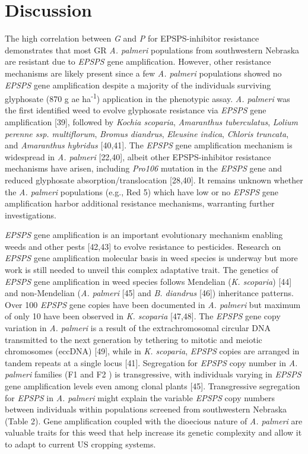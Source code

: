 \documentclass[10pt,letterpaper]{article}
\begin{document}
\hypertarget{discussion}{%
\section{Discussion}\label{discussion}}

The high correlation between \emph{G} and \emph{P} for EPSPS-inhibitor
resistance demonstrates that most GR \emph{A. palmeri} populations from
southwestern Nebraska are resistant due to \emph{EPSPS} gene
amplification. However, other resistance mechanisms are likely present
since a few \emph{A. palmeri} populations showed no \emph{EPSPS} gene
amplification despite a majority of the individuals surviving glyphosate
(870 g ae ha\textsuperscript{-1}) application in the phenotypic assay.
\emph{A. palmeri} was the first identified weed to evolve glyphosate
resistance via \emph{EPSPS} gene amplification {[}39{]}, followed by
\emph{Kochia scoparia}, \emph{Amaranthus tuberculatus}, \emph{Lolium
perenne ssp. multiflorum}, \emph{Bromus diandrus}, \emph{Eleusine
indica}, \emph{Chloris truncata}, and \emph{Amaranthus hybridus}
{[}40,41{]}. The \emph{EPSPS} gene amplification mechanism is widespread
in \emph{A. palmeri} {[}22,40{]}, albeit other EPSPS-inhibitor
resistance mechanisms have arisen, including \emph{Pro106} mutation in
the \emph{EPSPS} gene and reduced glyphosate absorption/translocation
{[}28,40{]}. It remains unknown whether the \emph{A. palmeri}
populations (e.g., Red 5) which have low or no \emph{EPSPS} gene
amplification harbor additional resistance mechanisms, warranting
further investigations.

\emph{EPSPS} gene amplification is an important evolutionary mechanism
enabling weeds and other pests {[}42,43{]} to evolve resistance to
pesticides. Research on \emph{EPSPS} gene amplification molecular basis
in weed species is underway but more work is still needed to unveil this
complex adaptative trait. The genetics of \emph{EPSPS} gene
amplification in weed species follows Mendelian (\emph{K. scoparia})
{[}44{]} and non-Mendelian (\emph{A. palmeri} {[}45{]} and \emph{B.
diandrus} {[}46{]}) inheritance patterns. Over 100 \emph{EPSPS} gene
copies have been documented in \emph{A. palmeri} but maximum of only 10
have been observed in \emph{K. scoparia} {[}47,48{]}. The \emph{EPSPS}
gene copy variation in \emph{A. palmeri} is a result of the
extrachromosomal circular DNA transmitted to the next generation by
tethering to mitotic and meiotic chromosomes (eccDNA) {[}49{]}, while in
\emph{K. scoparia}, \emph{EPSPS} copies are arranged in tandem repeats
at a single locus {[}41{]}. Segregation for \emph{EPSPS} copy number in
\emph{A. palmeri} families (F\scriptsize 1 \normalsize and
F\scriptsize 2 \normalsize) is transgressive, with individuals varying
in \emph{EPSPS} gene amplification levels even among clonal plants
{[}45{]}. Transgressive segregation for \emph{EPSPS} in \emph{A.
palmeri} might explain the variable \emph{EPSPS} copy numbers between
individuals within populations screened from southwestern Nebraska
(Table 2). Gene amplification coupled with the dioecious nature of
\emph{A. palmeri} are valuable traits for this weed that help increase
its genetic complexity and allow it to adapt to current US cropping
systems.
\end{document}
